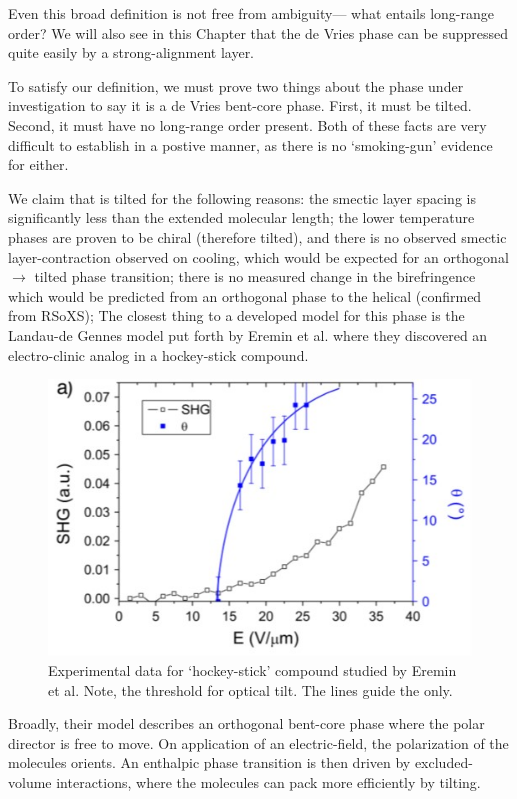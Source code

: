 \documentclass[aagreenthesis]{subfiles}
\begin{document}
Even this broad definition is not free from ambiguity--- what entails long-range
order? We will also see in this Chapter that the de Vries phase can be
suppressed quite easily by a strong-alignment layer.



To satisfy our definition, we must prove two things about the phase under
investigation to say it is a de Vries bent-core phase. First, it must be tilted.
Second, it must have no long-range order present. Both of these facts are very
difficult to establish in a postive manner, as there is no `smoking-gun'
evidence for either.

We claim that \nfour{} is tilted for the following reasons: the smectic layer spacing is
significantly less than the extended molecular length; the lower temperature
phases are proven to be chiral (therefore tilted), and there is no observed
smectic layer-contraction observed on cooling, which would be expected for an
orthogonal$\rightarrow$ tilted phase transition; there is no measured change in the birefringence which would be predicted from an orthogonal phase to the
helical \smcpalpha{} (confirmed from RSoXS);  
The closest thing to a developed model for this phase is the Landau-de Gennes
model put forth by Eremin et al.\cite{eremin2008electrically} where they
discovered an electro-clinic analog in a hockey-stick compound. 
\begin{figure}
    \centering
    \includegraphics[width=\textwidth]{./figs/pal30/fromPapers/tiltVfield.jpg}
    \caption{\label{fig:achiralTilt} Experimental data for `hockey-stick'
    compound studied by Eremin et al.\cite{eremin2008electrically} Note, the threshold for optical tilt. The lines guide the only.}
\end{figure}
Broadly, their model describes an orthogonal bent-core phase where the polar
director is free to move. On application of an electric-field, the polarization
of the molecules orients. An enthalpic phase transition
is then driven by excluded-volume interactions, where the molecules can pack
more efficiently by tilting. 
\end{document}

